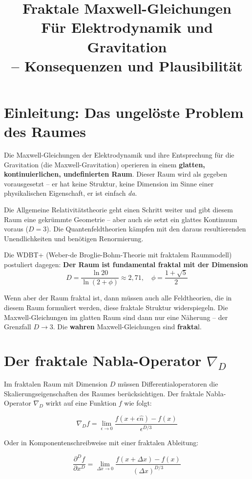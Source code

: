 \documentclass[12pt,a4paper]{article}
\title{\textbf{Fraktale Maxwell-Gleichungen} \\
\large Für Elektrodynamik und Gravitation \\
– Konsequenzen und Plausibilität}
\author{}
\date{}
\begin{document}
\maketitle

\section*{Einleitung: Das ungelöste Problem des Raumes}

Die Maxwell-Gleichungen der Elektrodynamik und ihre Entsprechung für die Gravitation (die Maxwell-Gravitation) operieren in einem \textbf{glatten, kontinuierlichen, undefinierten Raum}. Dieser Raum wird als gegeben vorausgesetzt – er hat keine Struktur, keine Dimension im Sinne einer physikalischen Eigenschaft, er ist einfach \textit{da}.

Die Allgemeine Relativitätstheorie geht einen Schritt weiter und gibt diesem Raum eine gekrümmte Geometrie – aber auch sie setzt ein glattes Kontinuum voraus (\(D = 3\)). Die Quantenfeldtheorien kämpfen mit den daraus resultierenden Unendlichkeiten und benötigen Renormierung.

Die WDBT+ (Weber-de Broglie-Bohm-Theorie mit fraktalem Raummodell) postuliert dagegen: \textbf{Der Raum ist fundamental fraktal mit der Dimension}
\[
D = \frac{\ln 20}{\ln(2+\phi)} \approx 2,71, \quad \phi = \frac{1+\sqrt{5}}{2}
\]

Wenn aber der Raum fraktal ist, dann müssen auch alle Feldtheorien, die in diesem Raum formuliert werden, diese fraktale Struktur widerspiegeln. Die Maxwell-Gleichungen im glatten Raum sind dann nur eine Näherung – der Grenzfall \(D \to 3\). Die \textbf{wahren} Maxwell-Gleichungen sind \textbf{frakta}l.

\section{Der fraktale Nabla-Operator \(\nabla_D\)}

Im fraktalen Raum mit Dimension \(D\) müssen Differentialoperatoren die Skalierungseigenschaften des Raumes berücksichtigen. Der fraktale Nabla-Operator \(\nabla_D\) wirkt auf eine Funktion \(f\) wie folgt:

\[
\nabla_D f = \lim_{\epsilon \to 0} \frac{f(x + \epsilon \hat{n}) - f(x)}{\epsilon^{D/3}}
\]

Oder in Komponentenschreibweise mit einer fraktalen Ableitung:

\[
\frac{\partial^D f}{\partial x^D} = \lim_{\Delta x \to 0} \frac{f(x + \Delta x) - f(x)}{(\Delta x)^{D/3}}
\]
\end{document}
